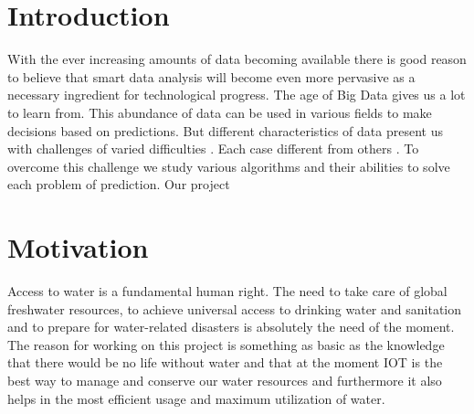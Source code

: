 \documentclass[12pt,times,a4paper]{report}
\begin{document}
{{\section{Introduction }
\begin{normalsize}
With the ever increasing amounts of data becoming
available there is good reason to believe that smart data analysis will become
even more pervasive as a necessary ingredient for technological progress. 
The age of Big Data gives us a lot to learn from. This abundance of data can be used in various fields to make decisions based on predictions. But different characteristics of data present us with challenges of varied difficulties . Each case different from others . To overcome 
this challenge we study various algorithms and their abilities to solve each problem of prediction. Our project 
\newpage
\section{Motivation}

Access to water is a fundamental human right. The need to take care of global freshwater resources, to achieve universal access to drinking water and sanitation and to prepare for water-related disasters is absolutely the need of the moment.
The reason for working on this project is something as basic as the knowledge that there would be no life without water and that at the moment IOT is the best way to manage and conserve our water resources and furthermore it also helps in the most efficient usage and maximum utilization of water.

\end{normalsize}}}
\end{document}
